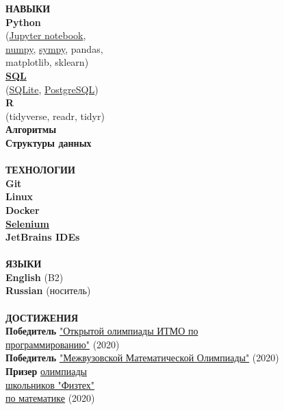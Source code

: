 \documentclass{article}
\begin{document}
\begin{vwcol}[widths={0.8,0.2},
 sep=.8cm, justify=flush,rule=0pt,indent=1em]
\noindent\textcolor[rgb]{0.1255,0.2902,0.7843}{\textbf{НАВЫКИ}}\\
\textbf{Python}\\(\href{https://github.com/NikPeg/synchronization-of-neuromorphic-networks-of-the-close-world-from-the-point-of-view-of-complexes}{Jupyter notebook},\\
\href{https://github.com/NikPeg/Reinforcement-learning-for-resource-allocation-tasks-in-the-cloud}{numpy}, \href{https://github.com/NikPeg/Calculus_and_Algebra_sympy}{sympy}, pandas,\\ matplotlib, sklearn)\\
\textbf{\href{https://github.com/NikPeg/CoffeePult}{SQL}}\\
(\href{https://github.com/NikPeg/ExtraterrestrialBot}{SQLite}, \href{https://github.com/NikPeg/CoffeePult}{PostgreSQL})\\
\textbf{R}\\(tidyverse, readr, tidyr)\\
\textbf{Алгоритмы}\\
\textbf{Структуры данных}\\
\\
\noindent\textcolor[rgb]{0.1255,0.2902,0.7843}{\textbf{ТЕХНОЛОГИИ}}\\
\textbf{
Git\\
Linux\\
Docker\\
\href{https://github.com/NikPeg/csbot}{Selenium}\\
JetBrains IDEs\\
}
\\
\noindent\textcolor[rgb]{0.1255,0.2902,0.7843}{\textbf{ЯЗЫКИ}}\\
\textbf{English} (B2)\\
\textbf{Russian} (носитель)\\
\\
\noindent\textcolor[rgb]{0.1255,0.2902,0.7843}{\textbf{ДОСТИЖЕНИЯ}}\\
\textbf{Победитель} \href{https://olymp.itmo.ru/}{"Открытой олимпиады ИТМО по\\программированию"} (2020)\\
\textbf{Победитель} \href{https://olympiads.mccme.ru/ommo/23/}{"Межвузовской Математической Олимпиады"} (2020)\\
\textbf{Призер} \href{https://olymp.mipt.ru/}{олимпиады\\школьников "Физтех"\\по математике} (2020)\\

\end{vwcol}
\end{document}
